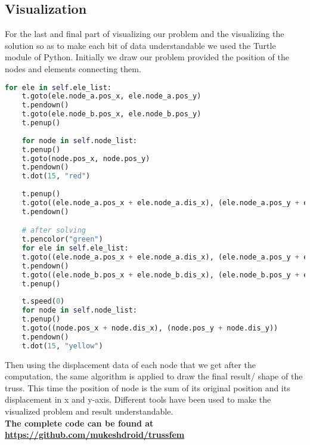\subsection{Visualization}
For the last and final part of visualizing our problem and the visualizing the solution so as to make each bit of data understandable we used the Turtle module of Python. Initially we draw our problem provided the position of the nodes and elements connecting them.

\begin{lstlisting}[language=Python , basicstyle=\linespread{0.75}\listingsfont]
	for ele in self.ele_list:
	t.goto(ele.node_a.pos_x, ele.node_a.pos_y)
	t.pendown()
	t.goto(ele.node_b.pos_x, ele.node_b.pos_y)
	t.penup()
	
	for node in self.node_list:
	t.penup()
	t.goto(node.pos_x, node.pos_y)
	t.pendown()
	t.dot(15, "red")
	
	t.penup()
	t.goto((ele.node_a.pos_x + ele.node_a.dis_x), (ele.node_a.pos_y + ele.node_a.dis_y))
	t.pendown()

	# after solving
	t.pencolor("green")
	for ele in self.ele_list:
	t.goto((ele.node_a.pos_x + ele.node_a.dis_x), (ele.node_a.pos_y + ele.node_a.dis_y))
	t.pendown()
	t.goto((ele.node_b.pos_x + ele.node_b.dis_x), (ele.node_b.pos_y + ele.node_b.dis_y))
	t.penup()
	
	t.speed(0)
	for node in self.node_list:
	t.penup()
	t.goto((node.pos_x + node.dis_x), (node.pos_y + node.dis_y))
	t.pendown()
	t.dot(15, "yellow")

\end{lstlisting}

 Then using the displacement data of each node that we get after the computation, the same algorithm is applied to draw the final result/ shape of the truss. This time the position of node is the sum of its original position and its displacement in x and y-axis. Different tools have been used to make the visualized problem and result understandable.\\
 
 
 \textbf{The complete code can be found at \url{https://github.com/mukeshdroid/trussfem}}

